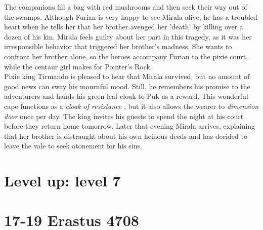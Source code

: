 The companions fill a bag with red mushrooms and then seek their way out of the swamps. Although Furian is very happy to see Mirala alive, he has a troubled heart when he tells her that her brother avenged her 'death' by killing over a dozen of his kin. Mirala feels guilty about her part in this tragedy, as it was her irresponsible behavior that triggered her brother's madness. She wants to confront her brother alone, so the heroes accompany Furian to the pixie court, while the centaur girl makes for Pointer's Rock.\\

Pixie king Tirmando is pleased to hear that Mirala survived, but no amount of good news can sway his mournful mood. Still, he remembers his promise to the adventurers and hands his green-leaf cloak to Puk as a reward. This wonderful cape functions as a {\itshape cloak of resistance} , but it also allows the wearer to  {\itshape dimension door} once per day. The king invites his guests to spend the night at his court before they return home tomorrow. Later that evening Mirala arrives, explaining that her brother is distraught about his own heinous deeds and has decided to leave the vale to seek atonement for his sins. \section{Level up: level 7}

\section{17-19 Erastus 4708}


